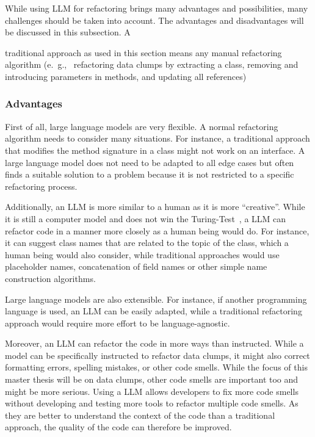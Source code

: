 While using  \ac{LLM} for refactoring brings many advantages  and possibilities, many challenges should be taken into account. The advantages and disadvantages will be discussed in this subsection. A {traditional approach as used in this section means any manual refactoring algorithm (e.~g.,~ refactoring data clumps by extracting a class, removing and introducing parameters in methods, and updating all references)

\subsubsection{Advantages}

First of all, large language models are very flexible. A normal refactoring algorithm needs to consider many situations. For instance, a traditional approach that modifies the method signature in a class might not work on an interface. A large language model does not need to be adapted to all edge cases but often finds a suitable solution to a problem because it is not restricted to a specific refactoring process.~\cite{shirafuji2023refactoring}

Additionally, an \ac{LLM} is more similar to a human as it is more  \enquote{creative}. While it is still a computer model and does not win the Turing-Test~\cite{turing_test}, a \ac{LLM} can refactor code in a manner more closely as a human being would do. For instance, it can suggest class names that are related to the topic of the class, which a human being would also consider, while traditional approaches would use placeholder names, concatenation of field names or other simple name construction algorithms.~\cite{shirafuji2023refactoring}

Large language models are also extensible. For instance, if another programming language is used, an \ac{LLM} can be easily adapted, while a traditional refactoring approach would require more effort to be language-agnostic.

Moreover, an \ac{LLM} can refactor the code in more ways than instructed. While a model can be specifically instructed to refactor data clumps, it might also correct formatting errors, spelling mistakes, or other code smells. While the focus of this master thesis will be on data clumps, other code smells are important too and might be more serious. Using a  \ac{LLM} allows developers to fix more code smells without developing and testing more tools to refactor multiple code smells. As they are better to understand the context of the code than a traditional approach, the quality of the code can therefore be improved.~\cite{shirafuji2023refactoring}

}

